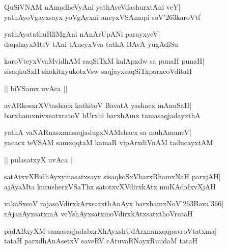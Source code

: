 \documentclass[twoside,12pt,openright]{book}
\def\S{\char'263}
\newcounter{shloka}[chapter]
\begin{document}
\begin{shloka}%
QuSiVNAM nAmadheVyAni yathAveVdashurxtAni veY|\\
yathAyoVgayxsayx yoVgAyxni aneyxVSAmapi soV\S karoVtf
\end{shloka}

\begin{shloka}%
yathAyatathuRliMgAni nAnArUpANi parayxyeV|\\
daqshayxMteV tAni tAneyxVva tathA BAvA yugAdiSu
\end{shloka}

\begin{shloka}%
karoVteyxVvaMvidhAM saqSiTxM kalApxdw sa punaH punaH|\\
sisaqkuSxH shakitxyukotxVsw saqjayxsaqSiTxparxcoVditaH
\end{shloka}

\begin{center}
|| biVSamx uvAca ||
\end{center}
\begin{shloka}%
avARkosxrXVtashacx kathitoV BavatA yashacx mAnuSaH|\\
barxhamxnivxsatxratoV bUrxhi barxhAmx tamasaqjadayxthA
\end{shloka}

\begin{shloka}%
yathA vaNARnasxmasaqjadugxNAMshacx sa muhAmuneV|\\
yacacx teVSAM samxqqtaM kamaR vipArxdiVnAM taducayxtAM
\end{shloka}

\begin{center}
|| pulasatxyX uvAca ||
\end{center}
\begin{shloka}%
satAtxvXBidhAyxyinasatxsayx sisaqkoSxVbarxRhamxNaH parxjAH|\\
ajAyaMta kurusherxVSaThx satotxvXVdirxkAtx muKAdidxvXjAH
\end{shloka}

\begin{shloka}%
vakaSxsoV rajasoVdirxkArxsatxthAnAyx barxhamxNoV\S Bava\char'366|\\
rAjanAyxsatxmA veYshAyxsatxmoVdirxkAtxsatxthoVrutaH
\end{shloka}

\begin{shloka}%
padABxyXM samasaqjadabxrXhAyxshUdArxnanxqqpavroVtatxma|\\
tataH parxdhAnAsetxV saveRV cAtuvaRNayxRmidaM tataH
\end{shloka}
\end{document}
